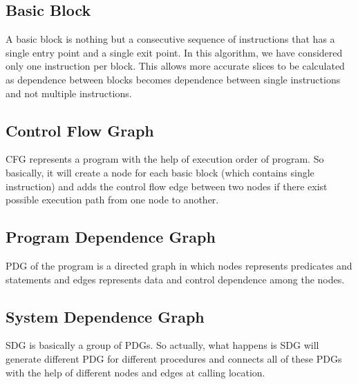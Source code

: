 \documentclass[conference]{IEEEtran}
\begin{document}
\subsection{Basic Block}
\par A basic block is nothing but a consecutive sequence of instructions that has a single entry point and a single exit point. In this algorithm, we have considered only one instruction per block. This allows more accurate slices to be calculated as dependence between blocks becomes dependence between single instructions and not multiple instructions.
\subsection{Control Flow Graph} 
CFG represents a program with the help of execution order of program. So basically, it will create a node for each basic block (which contains single instruction) and adds the control flow edge between two nodes if there exist possible execution path from one node to another. 
\subsection{Program Dependence Graph}
\par PDG of the program is a directed graph in which nodes represents predicates and statements and edges represents data and control dependence among the nodes.
\subsection{System Dependence Graph}
\par SDG is basically a group of PDGs. So actually, what happens is SDG will generate different PDG for different procedures and connects all of these PDGs with the help of different nodes and edges at calling location. 
\end{document}

